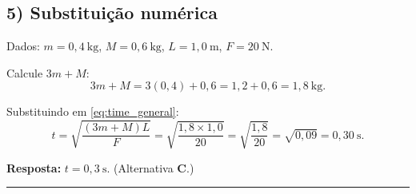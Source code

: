 \documentclass[a4paper,12pt]{article}
\begin{document}
\begin{flushleft}
\subsection*{5) Substituição numérica}

Dados: $m=0{,}4\ \mathrm{kg}$, $M=0{,}6\ \mathrm{kg}$, $L=1{,}0\ \mathrm{m}$, $F=20\ \mathrm{N}$.

Calcule $3m+M$:
\[
3m+M = 3(0{,}4)+0{,}6 = 1{,}2+0{,}6 = 1{,}8\ \mathrm{kg}.
\]

Substituindo em \eqref{eq:time_general}:
\[
t = \sqrt{\frac{(3m+M) L}{F}}
= \sqrt{\frac{1{,}8\times 1{,}0}{20}}
= \sqrt{\frac{1{,}8}{20}}
= \sqrt{0{,}09}
= 0{,}30\ \mathrm{s}.
\]

\bigskip
\noindent\textbf{Resposta:} $t = 0{,}3\ \mathrm{s}$. (Alternativa \textbf{C}.)


\end{flushleft}

\noindent\rule{\linewidth}{0.4pt}\\
\end{document}
